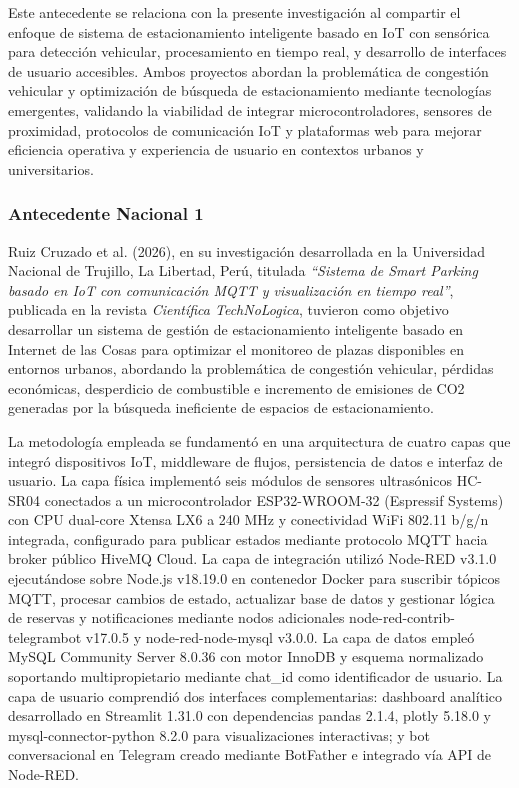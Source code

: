 \documentclass[12pt,a4paper]{article}
\begin{document}
Este antecedente se relaciona con la presente investigación al compartir el enfoque de sistema de estacionamiento inteligente basado en IoT con sensórica para detección vehicular, procesamiento en tiempo real, y desarrollo de interfaces de usuario accesibles. Ambos proyectos abordan la problemática de congestión vehicular y optimización de búsqueda de estacionamiento mediante tecnologías emergentes, validando la viabilidad de integrar microcontroladores, sensores de proximidad, protocolos de comunicación IoT y plataformas web para mejorar eficiencia operativa y experiencia de usuario en contextos urbanos y universitarios.

\subsubsection{Antecedente Nacional 1}

Ruiz Cruzado et al. (2026), en su investigación desarrollada en la Universidad Nacional de Trujillo, La Libertad, Perú, titulada \textit{``Sistema de Smart Parking basado en IoT con comunicación MQTT y visualización en tiempo real''}, publicada en la revista \textit{Científica TechNoLogica}, tuvieron como objetivo desarrollar un sistema de gestión de estacionamiento inteligente basado en Internet de las Cosas para optimizar el monitoreo de plazas disponibles en entornos urbanos, abordando la problemática de congestión vehicular, pérdidas económicas, desperdicio de combustible e incremento de emisiones de CO2 generadas por la búsqueda ineficiente de espacios de estacionamiento.

La metodología empleada se fundamentó en una arquitectura de cuatro capas que integró dispositivos IoT, middleware de flujos, persistencia de datos e interfaz de usuario. La capa física implementó seis módulos de sensores ultrasónicos HC-SR04 conectados a un microcontrolador ESP32-WROOM-32 (Espressif Systems) con CPU dual-core Xtensa LX6 a 240 MHz y conectividad WiFi 802.11 b/g/n integrada, configurado para publicar estados mediante protocolo MQTT hacia broker público HiveMQ Cloud. La capa de integración utilizó Node-RED v3.1.0 ejecutándose sobre Node.js v18.19.0 en contenedor Docker para suscribir tópicos MQTT, procesar cambios de estado, actualizar base de datos y gestionar lógica de reservas y notificaciones mediante nodos adicionales node-red-contrib-telegrambot v17.0.5 y node-red-node-mysql v3.0.0. La capa de datos empleó MySQL Community Server 8.0.36 con motor InnoDB y esquema normalizado soportando multipropietario mediante chat\_id como identificador de usuario. La capa de usuario comprendió dos interfaces complementarias: dashboard analítico desarrollado en Streamlit 1.31.0 con dependencias pandas 2.1.4, plotly 5.18.0 y mysql-connector-python 8.2.0 para visualizaciones interactivas; y bot conversacional en Telegram creado mediante BotFather e integrado vía API de Node-RED.
\end{document}
